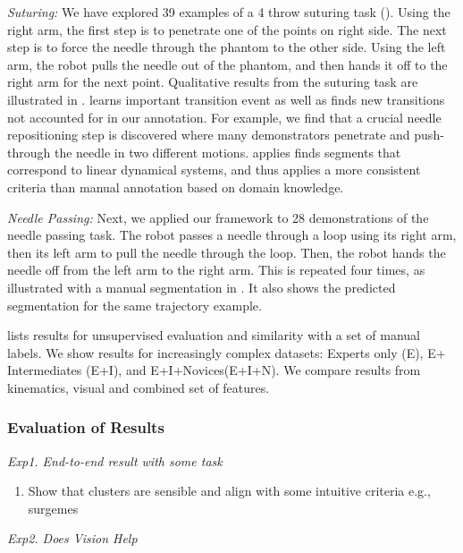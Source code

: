 \documentclass[0-main.tex]{subfiles}
\begin{document}
\vspace{0.5em}
\noindent\textit{Suturing: }We have explored 39 examples of a 4 throw suturing task (). Using the right arm, the first step is to penetrate one of the points on right side. The next step is to force the needle through the phantom to the other side. Using the left arm, the robot pulls the needle out of the phantom, and then hands it off to the right arm for the next point. Qualitative results from the suturing task are illustrated in .
\tsc learns important transition event as well as finds new transitions not accounted for in our annotation.
For example, we find that a crucial needle repositioning step is discovered where many demonstrators penetrate and push-through the needle in two different motions.
\tsc applies finds segments that correspond to linear dynamical systems, and thus applies a more consistent criteria than manual annotation based on domain knowledge.

\vspace{0.5em}
\noindent\textit{Needle Passing: } Next, we applied our framework to 28 demonstrations of the needle passing task.
The robot passes a needle through a loop using its right arm, then its left arm to pull the needle through the loop. Then, the robot hands the needle off from the left arm to the right arm. This is repeated four times, as illustrated with a manual segmentation in . It also shows the predicted segmentation for the same trajectory example. 

 lists results for unsupervised evaluation and similarity with a set of manual labels. We show results for increasingly complex datasets: Experts only (E), E+ Intermediates (E+I), and E+I+Novices(E+I+N). We compare results from kinematics, visual and combined set of features.


\iffalse
\subsubsection{Evaluation of Results }

\noindent \textit{Exp1. End-to-end result with some task}

\begin{enumerate}
\item Show that clusters are sensible and align with some intuitive criteria e.g., surgemes
\end{enumerate}

\noindent \textit{Exp2. Does Vision Help}
\end{document}
